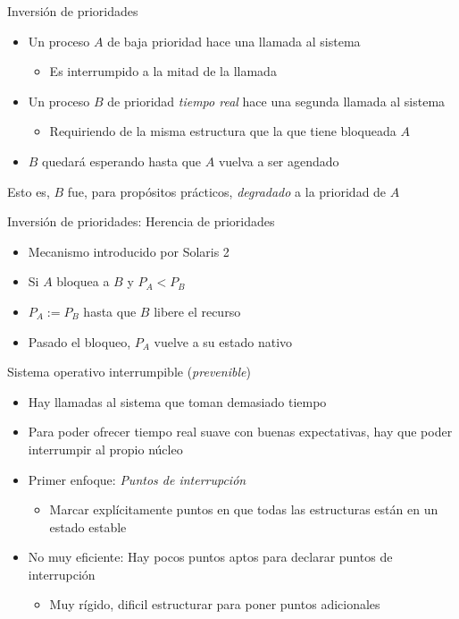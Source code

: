 \documentclass[presentation]{beamer}
\begin{document}
\begin{frame}[label={sec:orga632f86}]{Inversión de prioridades}
\begin{itemize}
\item Un proceso \(A\) de baja prioridad hace una llamada al sistema
\begin{itemize}
\item Es interrumpido a la mitad de la llamada
\end{itemize}
\item Un proceso \(B\) de prioridad \emph{tiempo real} hace una segunda llamada
al sistema
\begin{itemize}
\item Requiriendo de la misma estructura que la que tiene bloqueada \(A\)
\end{itemize}
\item \(B\) quedará esperando hasta que \(A\) vuelva a ser agendado
\end{itemize}
\begin{center}
Esto es, \(B\) fue, para propósitos prácticos, \emph{degradado} a la
prioridad de \(A\)
\end{center}
\end{frame}

\begin{frame}[label={sec:orgc96085b}]{Inversión de prioridades: Herencia de prioridades}
\begin{itemize}
\item Mecanismo introducido por Solaris 2
\item Si \(A\) bloquea a \(B\) y \(P_A < P_B\)
\item \(P_A := P_B\) hasta que \(B\) libere el recurso
\item Pasado el bloqueo, \(P_A\) vuelve a su estado nativo
\end{itemize}
\end{frame}

\begin{frame}[label={sec:org2bd82e2}]{Sistema operativo interrumpible (\emph{prevenible})}
\begin{itemize}
\item Hay llamadas al sistema que toman demasiado tiempo
\item Para poder ofrecer tiempo real suave con buenas expectativas, hay
que poder interrumpir al propio núcleo
\item Primer enfoque: \emph{Puntos de interrupción}
\begin{itemize}
\item Marcar explícitamente puntos en que todas las estructuras están
en un estado estable
\end{itemize}
\item No muy eficiente: Hay pocos puntos aptos para declarar puntos de
interrupción
\begin{itemize}
\item Muy rígido, dificil estructurar para poner puntos adicionales
\end{itemize}
\end{itemize}
\end{frame}
\end{document}
